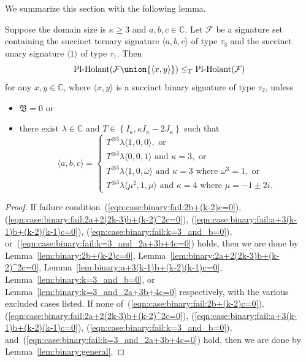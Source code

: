\documentclass[11pt]{article}
\newcommand{\PlHolant}{\operatorname{Pl-Holant}}
\begin{document}
We summarize this section with the following lemma.

\begin{corollary} \label{cor:binary:interpolate}
 Suppose the domain size is $\kappa \ge 3$ and $a, b, c \in \mathbb{C}$.
 Let $\mathcal{F}$ be a signature set containing the succinct ternary signature $\langle a, b, c \rangle$ of type $\tau_3$
 and the succinct unary signature $\langle 1 \rangle$ of type $\tau_1$.
 Then
 \[
  \PlHolant(\mathcal{F} \union \{\langle x,y \rangle\}) \le_T \PlHolant(\mathcal{F})
 \]
 for any $x,y \in \mathbb{C}$,
 where $\langle x,y \rangle$ is a succinct binary signature of type $\tau_2$,
 unless
 \begin{itemize}
  \item $\mathfrak{B} = 0$ or
  \item there exist $\lambda \in \mathbb{C}$ and $T \in \left\{I_\kappa, \kappa I_\kappa - 2 J_\kappa\right\}$ such that
  \[
   \langle a,b,c \rangle =
   \begin{cases}
    T^{\otimes 3} \lambda \langle 1,0,0 \rangle, \text{ or}\\
    T^{\otimes 3} \lambda \langle 0,0,1 \rangle \text{ and } \kappa = 3, \text{ or}\\
    T^{\otimes 3} \lambda \langle 1,0,\omega  \rangle \text{ and } \kappa = 3 \text{ where } \omega^3 = 1, \text{ or}\\
    T^{\otimes 3} \lambda \langle \mu^2,1,\mu \rangle \text{ and } \kappa = 4 \text{ where } \mu = -1 \pm 2 i.
   \end{cases}
  \]
 \end{itemize}
\end{corollary}

\begin{proof}
 If failure condition~(\ref{eqn:case:binary:fail:2b+(k-2)c=0}),
 (\ref{eqn:case:binary:fail:2a+2(2k-3)b+(k-2)^2c=0}),
 (\ref{eqn:case:binary:fail:a+3(k-1)b+(k-2)(k-1)c=0}),
 (\ref{eqn:case:binary:fail:k=3_and_b=0}),
 or~(\ref{eqn:case:binary:fail:k=3_and_2a+3b+4c=0}) holds,
 then we are done by
 Lemma~\ref{lem:binary:2b+(k-2)c=0},
 Lemma~\ref{lem:binary:2a+2(2k-3)b+(k-2)^2c=0},
 Lemma~\ref{lem:binary:a+3(k-1)b+(k-2)(k-1)c=0},
 Lemma~\ref{lem:binary:k=3_and_b=0}, or
 Lemma~\ref{lem:binary:k=3_and_2a+3b+4c=0} respectively,
 with the various excluded cases listed.
 If none of~(\ref{eqn:case:binary:fail:2b+(k-2)c=0}),
 (\ref{eqn:case:binary:fail:2a+2(2k-3)b+(k-2)^2c=0}),
 (\ref{eqn:case:binary:fail:a+3(k-1)b+(k-2)(k-1)c=0}),
 (\ref{eqn:case:binary:fail:k=3_and_b=0}),
 and~(\ref{eqn:case:binary:fail:k=3_and_2a+3b+4c=0}) hold,
 then we are done by Lemma~\ref{lem:binary:general}.
\end{proof}
\end{document}
